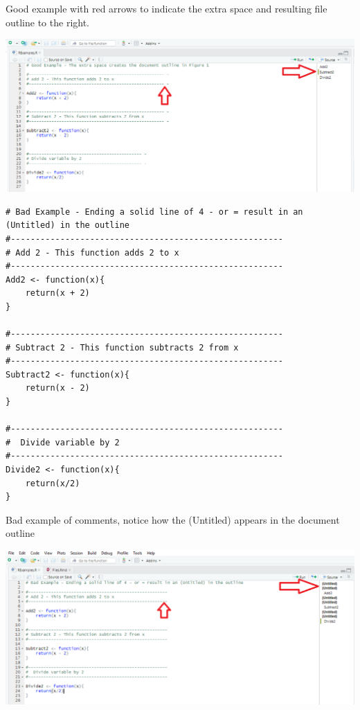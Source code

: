 \documentclass[
]{book}
\begin{document}
Good example with red arrows to indicate the extra space and resulting file outline to the right.

\begin{center}\includegraphics{images/FileCommentGoodExample} \end{center}

\begin{verbatim}
# Bad Example - Ending a solid line of 4 - or = result in an (Untitled) in the outline
#-------------------------------------------------------
# Add 2 - This function adds 2 to x
#-------------------------------------------------------
Add2 <- function(x){
    return(x + 2)
}

#-------------------------------------------------------
# Subtract 2 - This function subtracts 2 from x
#-------------------------------------------------------
Subtract2 <- function(x){
    return(x - 2)
}

#-------------------------------------------------------
#  Divide variable by 2
#-------------------------------------------------------
Divide2 <- function(x){
    return(x/2)
}
\end{verbatim}

Bad example of comments, notice how the (Untitled) appears in the document outline

\begin{center}\includegraphics{images/FileCommentBadExample} \end{center}
\end{document}
